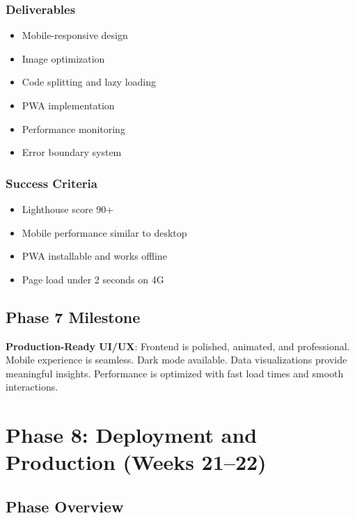 \documentclass[12pt,oneside]{report}
\begin{document}
\subsubsection{Deliverables}

\begin{itemize}
    \item Mobile-responsive design
    \item Image optimization
    \item Code splitting and lazy loading
    \item PWA implementation
    \item Performance monitoring
    \item Error boundary system
\end{itemize}

\subsubsection{Success Criteria}

\begin{itemize}
    \item Lighthouse score 90+
    \item Mobile performance similar to desktop
    \item PWA installable and works offline
    \item Page load under 2 seconds on 4G
\end{itemize}

\subsection{Phase 7 Milestone}

\textbf{Production-Ready UI/UX}: Frontend is polished, animated, and professional. Mobile experience is seamless. Dark mode available. Data visualizations provide meaningful insights. Performance is optimized with fast load times and smooth interactions.

\section{Phase 8: Deployment and Production (Weeks 21--22)}

\subsection{Phase Overview}
\end{document}
